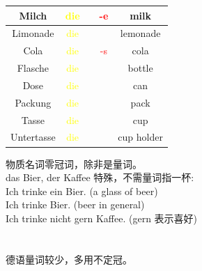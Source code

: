 \begin{center}
\begin{tabular} {|c|c|c|c|c|}
        \hline
        Milch                     & \textcolor{yellow}{die} &          & \textcolor{red}{-e} & milk          \\
        \hline
        Limonade                  & \textcolor{yellow}{die} &          &                     & lemonade      \\
        \hline
        Cola                      & \textcolor{yellow}{die} &          & \textcolor{red}{-s} & cola          \\
        \hline
        Flasche                   & \textcolor{yellow}{die} &          &                     & bottle        \\
        Dose                      & \textcolor{yellow}{die} &          &                     & can           \\
        Packung                   & \textcolor{yellow}{die} &          &                     & pack          \\
        Tasse                     & \textcolor{yellow}{die} &          &                     & cup           \\
        Untertasse                & \textcolor{yellow}{die} &          &                     & cup holder    \\
        \hline
    \end{tabular}
\end{center}

\noindent
物质名词零冠词，除非是量词。\\
das Bier, der Kaffee 特殊，不需量词指一杯: \\
Ich trinke ein Bier. (a glass of beer) \\
Ich trinke Bier. (beer in general) \\
Ich trinke nicht gern Kaffee. (gern 表示喜好)\\
\\
\\
德语量词较少，多用不定冠。

